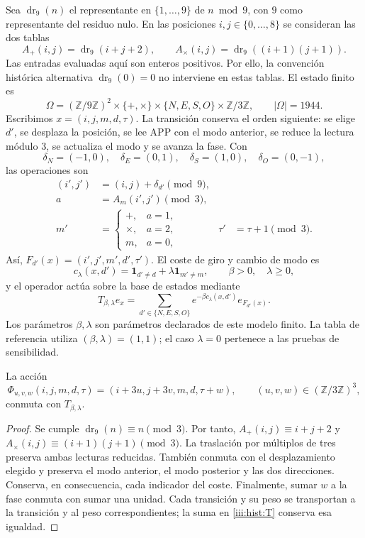 Sea $\operatorname{dr}_9(n)$ el representante en $\{1,\ldots,9\}$ de
$n\bmod9$, con $9$ como representante del residuo nulo. En las posiciones
$i,j\in\{0,\ldots,8\}$ se consideran las dos tablas
\[
 A_+(i,j)=\operatorname{dr}_9(i+j+2),\qquad
 A_\times(i,j)=\operatorname{dr}_9((i+1)(j+1)).
\]
Las entradas evaluadas aquí son enteros positivos. Por ello, la convención
histórica alternativa $\operatorname{dr}_9(0)=0$ no interviene en estas tablas.
El estado finito es
\[
 \Omega=(\mathbb Z/9\mathbb Z)^2\times\{+,\times\}
 \times\{N,E,S,O\}\times\mathbb Z/3\mathbb Z,
 \qquad |\Omega|=1944.
\]
Escribimos $x=(i,j,m,d,\tau)$. La transición conserva el orden siguiente:
se elige $d'$, se desplaza la posición, se lee APP con el modo anterior,
se reduce la lectura módulo $3$, se actualiza el modo y se avanza la fase.
Con
\[
 \delta_N=(-1,0),\quad\delta_E=(0,1),\quad
 \delta_S=(1,0),\quad\delta_O=(0,-1),
\]
las operaciones son
\begin{align*}
 (i',j')&=(i,j)+\delta_{d'}\pmod9,\\
 a&=A_m(i',j')\pmod3,\\
 m'&=\begin{cases}+,&a=1,\\\times,&a=2,\\m,&a=0,\end{cases}
 &\tau'&=\tau+1\pmod3.
\end{align*}
Así, $F_{d'}(x)=(i',j',m',d',\tau')$. El coste de giro y cambio de modo es
\[
 c_\lambda(x,d')=\mathbf1_{d'\ne d}+\lambda\mathbf1_{m'\ne m},
 \qquad \beta>0,\quad\lambda\geq0,
\]
y el operador actúa sobre la base de estados mediante
\begin{equation}
 T_{\beta,\lambda}e_x
 =\sum_{d'\in\{N,E,S,O\}}
 e^{-\beta c_\lambda(x,d')}e_{F_{d'}(x)}.
 \label{iii:hist:T}
\end{equation}
Los parámetros $\beta,\lambda$ son parámetros declarados de este modelo
finito. La tabla de referencia utiliza $(\beta,\lambda)=(1,1)$; el caso
$\lambda=0$ pertenece a las pruebas de sensibilidad.

\begin{proposition}
\label{iii:hist:equivarianza}
La acción
\[
 \Phi_{u,v,w}(i,j,m,d,\tau)
 =(i+3u,j+3v,m,d,\tau+w),\qquad
 (u,v,w)\in(\mathbb Z/3\mathbb Z)^3,
\]
conmuta con $T_{\beta,\lambda}$.
\end{proposition}
\begin{proof}
Se cumple $\operatorname{dr}_9(n)\equiv n\pmod3$. Por tanto,
$A_+(i,j)\equiv i+j+2$ y
$A_\times(i,j)\equiv(i+1)(j+1)\pmod3$.
La traslación por múltiplos de tres preserva ambas lecturas reducidas.
También conmuta con el desplazamiento elegido y preserva el modo anterior,
el modo posterior y las dos direcciones. Conserva, en consecuencia, cada
indicador del coste. Finalmente, sumar $w$ a la fase conmuta con sumar una
unidad. Cada transición y su peso se transportan a la transición y al peso
correspondientes; la suma en \eqref{iii:hist:T} conserva esa igualdad.
\end{proof}

